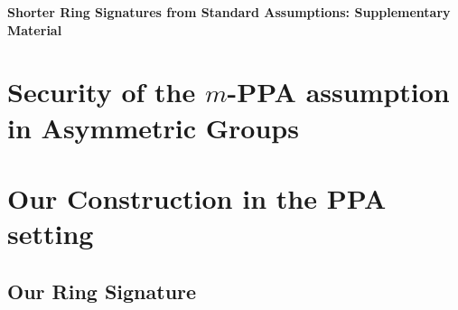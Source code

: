 \documentclass{llncs}
\begin{document}





\newpage
\appendix

\begin{center}\begin{Large}{\bf
Shorter Ring Signatures from Standard Assumptions: Supplementary Material
}\end{Large}\end{center}
\vspace{1cm}

	\section{Security of the $m$-PPA assumption in Asymmetric Groups} \label{sec:aPPA}
	
		
		

		
		
	\section{Our Construction in the PPA setting} \label{sec:ppa-full}
	
		
		
		\subsection{Our Ring Signature}\label{sec:our-construction-ppa}
        			 
			


\end{document}
